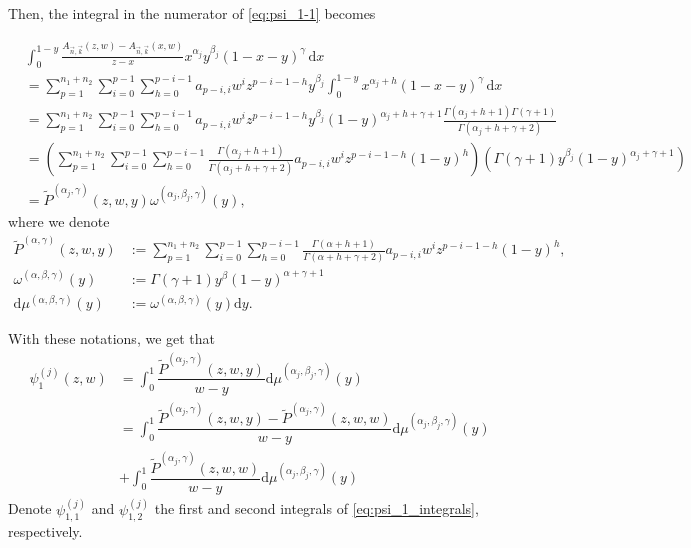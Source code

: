 \documentclass[11pt,reqno]{amsart}
\newcommand{\dr}{\mathrm{d}}
\theoremstyle{definition}
\begin{document}
Then, the integral in the numerator of \eqref{eq:psi_1-1} becomes

$$\begin{aligned}
&\int_0^{1-y} \frac{A_{\vec n,\vec k}(z,w) -A_{\vec n,\vec k}(x,w)}{z-x} x^{\alpha_j} y^{\beta_j} (1-x-y)^{\gamma} \, \dr x
\\ &=\sum_{p=1}^{n_1+n_2} 
\sum_{i=0}^{p-1} \sum_{h=0}^{p-i-1} a_{p-i,i}  w^i z^{p-i-1-h} y^{\beta_j} \int_0^{1-y} x^{\alpha_j+h}  (1-x-y)^{\gamma} \, \dr x\\
&= \sum_{p=1}^{n_1+n_2} 
\sum_{i=0}^{p-1} \sum_{h=0}^{p-i-1} a_{p-i,i}  w^i z^{p-i-1-h} y^{\beta_j} (1-y)^{\alpha_j+h+\gamma+1}\frac{\Gamma(\alpha_j+h+1)\Gamma(\gamma+1) }{\Gamma(\alpha_j+h+\gamma+2)}\\
&= \left(\sum_{p=1}^{n_1+n_2} 
\sum_{i=0}^{p-1} \sum_{h=0}^{p-i-1}\frac{\Gamma(\alpha_j+h+1) }{\Gamma(\alpha_j+h+\gamma+2)} a_{p-i,i}  w^i z^{p-i-1-h} (1-y)^{h}
\right)\left(  \Gamma(\gamma+1) y^{\beta_j}(1-y)^{\alpha_j+\gamma+1} \right)\\
&= \tilde P^{(\alpha_j,\gamma)} (z,w,y) \omega^{(\alpha_j,\beta_j,\gamma)}(y),
\end{aligned}$$
where we denote
\begin{equation}
\label{eq:numerator-1}
    \begin{array}{rl}
        \tilde P^{(\alpha,\gamma)} (z,w,y) &:=\displaystyle\sum_{p=1}^{n_1+n_2} 
        \sum_{i=0}^{p-1} \sum_{h=0}^{p-i-1}\frac{\Gamma(\alpha+h+1) }{\Gamma(\alpha+h+\gamma+2)} a_{p-i,i}  w^i z^{p-i-1-h} (1-y)^{h}
        , \\[12pt] 
        \omega^{(\alpha,\beta,\gamma)}(y)&:=\Gamma(\gamma+1) y^{\beta}(1-y)^{\alpha+\gamma+1} \\[10pt]
        \dr \mu^{(\alpha,\beta,\gamma)}(y)&:= \omega^{(\alpha,\beta,\gamma)}(y)\dr y.
    \end{array}
\end{equation}

With these notations, we get that
\begin{equation}
    \label{eq:psi_1_integrals}
    \begin{aligned}
    \psi_1^{(j)}(z,w)&= \int_0^1 \dfrac{\tilde{P}^{(\alpha_j,\gamma)}(z,w,y)}{w-y}\dr \mu^{(\alpha_j,\beta_j,\gamma)}(y)\\
    &= \int_0^1 \dfrac{\tilde{P}^{(\alpha_j,\gamma)}(z,w,y)-\tilde{P}^{(\alpha_j,\gamma)}(z,w,w)}{w-y}\dr \mu^{(\alpha_j, \beta_j, \gamma)}(y)\\ &+\int_0^1 \dfrac{\tilde{P}^{(\alpha_j,\gamma)}(z,w,w)}{w-y}\dr \mu^{(\alpha_j,\beta_j,\gamma)}(y)
\end{aligned}
\end{equation}
Denote $\psi_{1,1}^{(j)}$ and $\psi_{1,2}^{(j)}$ the first and second integrals of \eqref{eq:psi_1_integrals}, respectively.
\end{document}
